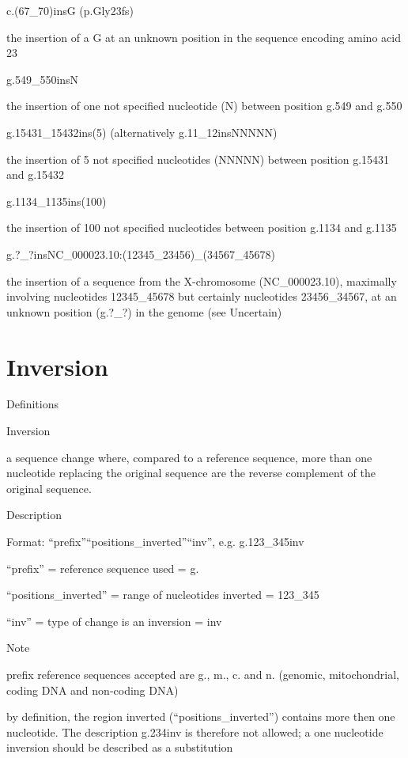 \documentclass{book}
\begin{document}
	c.(67\_70)insG (p.Gly23fs)

	the insertion of a G at an unknown position in the sequence encoding amino acid 23

	g.549\_550insN

	the insertion of one not specified nucleotide (N) between position g.549 and g.550

	g.15431\_15432ins(5) (alternatively g.11\_12insNNNNN)

	the insertion of 5 not specified nucleotides (NNNNN) between position g.15431 and g.15432

	g.1134\_1135ins(100)

	the insertion of 100 not specified nucleotides between position g.1134 and g.1135

	g.?\_?insNC\_000023.10:(12345\_23456)\_(34567\_45678)

	the insertion of a sequence from the X-chromosome (NC\_000023.10), maximally involving nucleotides 12345\_45678 but certainly nucleotides 23456\_34567, at an unknown position (g.?\_?) in the genome (see Uncertain)

	

	\section{Inversion}

	

	Definitions

	Inversion

	a sequence change where, compared to a reference sequence, more than one nucleotide replacing the original sequence are the reverse complement of the original sequence.

	

	

	Description

	Format: “prefix”“positions\_inverted”“inv”, e.g. g.123\_345inv

	“prefix” = reference sequence used = g.

	“positions\_inverted” = range of nucleotides inverted = 123\_345

	“inv” = type of change is an inversion = inv

	

	Note

	prefix reference sequences accepted are g., m., c. and n. (genomic, mitochondrial, coding DNA and non-coding DNA)

	by definition, the region inverted (“positions\_inverted”) contains more then one nucleotide. The description g.234inv is therefore not allowed; a one nucleotide inversion should be described as a substitution
\end{document}
